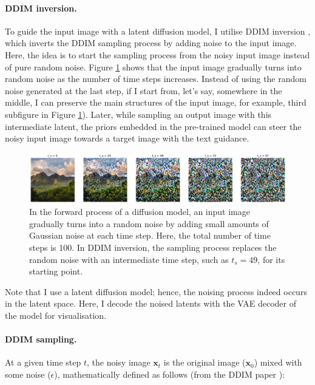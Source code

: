 

\paragraph{DDIM inversion.} To guide the input image with a latent diffusion model, I utilise \gls{DDIM} inversion \cite{dhariwal2021diffusion,song2020denoising} , which inverts the DDIM sampling process by adding noise to the input image. Here, the idea is to start the sampling process from the noisy input image instead of pure random noise. Figure \ref{fig:ddim-inversion} shows that the input image gradually turns into random noise as the number of time steps increases. Instead of using the random noise generated at the last step, if I start from, let’s say, somewhere in the middle, I can preserve the main structures of the input image, for example, third subfigure in Figure  \ref{fig:ddim-inversion}). Later, while sampling an output image with this intermediate latent, the priors embedded in the pre-trained model can steer the noisy input image towards a target image with the text guidance.

\begin{figure}[ht]
  \includegraphics[width=\textwidth]{Chapters/zero-shot-tat-figs/DDIM_forward.png}
  \caption{In the forward process of a diffusion model, an input image gradually turns into a random noise by adding small amounts of Gaussian noise at each time step. Here, the total number of time steps is 100. In DDIM inversion, the sampling process replaces the random noise with an intermediate time step, such as $t_s = 49$, for its starting point.}
  \label{fig:ddim-inversion}
\end{figure}

Note that I use a latent diffusion model; hence, the noising process indeed occurs in the latent space. Here, I decode the noised latents with the VAE decoder of the model for visualisation. 

\paragraph{DDIM sampling.}
At a given time step $t$, the noisy image $\bm{x}_t$ is the original image ($\bm{x}_0$) mixed with some noise ($\epsilon$), mathematically defined as follows (from the DDIM paper \cite{song2020denoising}):

